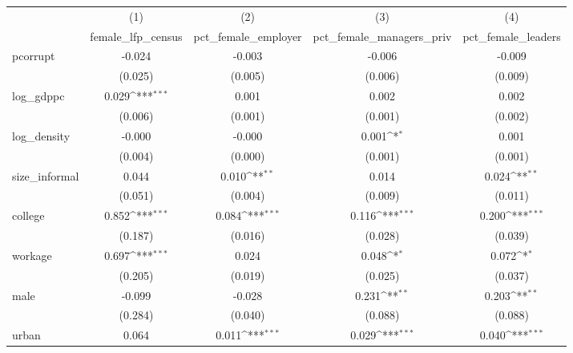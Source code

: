 {
\def\sym#1{\ifmmode^{#1}\else\(^{#1}\)\fi}
\begin{tabular}{l*{4}{c}}
\hline\hline
            &\multicolumn{1}{c}{(1)}&\multicolumn{1}{c}{(2)}&\multicolumn{1}{c}{(3)}&\multicolumn{1}{c}{(4)}\\
            &\multicolumn{1}{c}{female\_lfp\_census}&\multicolumn{1}{c}{pct\_female\_employer}&\multicolumn{1}{c}{pct\_female\_managers\_priv}&\multicolumn{1}{c}{pct\_female\_leaders}\\
\hline
pcorrupt    &      -0.024         &      -0.003         &      -0.006         &      -0.009         \\
            &     (0.025)         &     (0.005)         &     (0.006)         &     (0.009)         \\
[1em]
log\_gdppc   &       0.029\sym{***}&       0.001         &       0.002         &       0.002         \\
            &     (0.006)         &     (0.001)         &     (0.001)         &     (0.002)         \\
[1em]
log\_density &      -0.000         &      -0.000         &       0.001\sym{*}  &       0.001         \\
            &     (0.004)         &     (0.000)         &     (0.001)         &     (0.001)         \\
[1em]
size\_informal&       0.044         &       0.010\sym{**} &       0.014         &       0.024\sym{**} \\
            &     (0.051)         &     (0.004)         &     (0.009)         &     (0.011)         \\
[1em]
college     &       0.852\sym{***}&       0.084\sym{***}&       0.116\sym{***}&       0.200\sym{***}\\
            &     (0.187)         &     (0.016)         &     (0.028)         &     (0.039)         \\
[1em]
workage     &       0.697\sym{***}&       0.024         &       0.048\sym{*}  &       0.072\sym{*}  \\
            &     (0.205)         &     (0.019)         &     (0.025)         &     (0.037)         \\
[1em]
male        &      -0.099         &      -0.028         &       0.231\sym{**} &       0.203\sym{**} \\
            &     (0.284)         &     (0.040)         &     (0.088)         &     (0.088)         \\
[1em]
urban       &       0.064         &       0.011\sym{***}&       0.029\sym{***}&       0.040\sym{***}\\

\end{tabular}}
